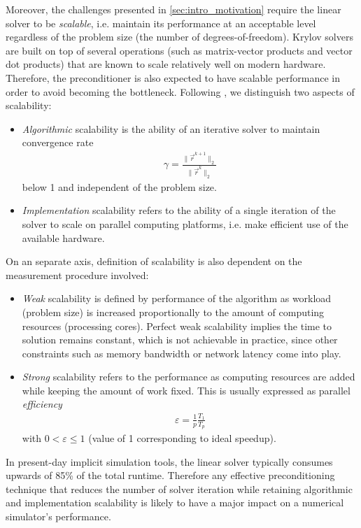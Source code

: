 Moreover, the challenges presented in \cref{sec:intro_motivation} require the linear solver to be \textit{scalable}, i.e. maintain its performance at an acceptable level regardless of the problem size (the number of degrees-of-freedom).   Krylov solvers are built on top of several operations (such as matrix-vector products and vector dot products) that are known to scale relatively well on modern hardware.   Therefore, the preconditioner is also expected to have scalable performance in order to avoid becoming the bottleneck.   Following \cite{Manea2015}, we distinguish two aspects of scalability:
\begin{itemize}
    \item \textit{Algorithmic} scalability is the ability of an iterative solver to maintain convergence rate 
    \begin{align}
        \gamma = \frac{\|\vec{r}^{k+1}\|_2}{\|\vec{r}^k\|_2}
    \end{align}
    below 1 and independent of the problem size.
    \item \textit{Implementation} scalability refers to the ability of a single iteration of the solver to scale on parallel computing platforms, i.e. make efficient use of the available hardware.
\end{itemize}
On an separate axis, definition of scalability is also dependent on the measurement procedure involved:
\begin{itemize}
    \item \textit{Weak} scalability is defined by performance of the algorithm as workload (problem size) is increased proportionally to the amount of computing resources (processing cores).   Perfect weak scalability implies the time to solution remains constant, which is not achievable in practice, since other constraints such as memory bandwidth or network latency come into play.
    \item \textit{Strong} scalability refers to the performance as computing resources are added while keeping the amount of work fixed.   This is usually expressed as parallel \textit{efficiency}
    \begin{align}
        \varepsilon = \frac{1}{p}\frac{T_1}{T_p}
    \end{align}
    with $0 < \varepsilon \leq 1$ (value of 1 corresponding to ideal speedup).
\end{itemize}
In present-day implicit simulation tools, the linear solver typically consumes upwards of 85\% of the total runtime.   Therefore any effective preconditioning technique that reduces the number of solver iteration while retaining algorithmic and implementation scalability is likely to have a major impact on a numerical simulator's performance.

